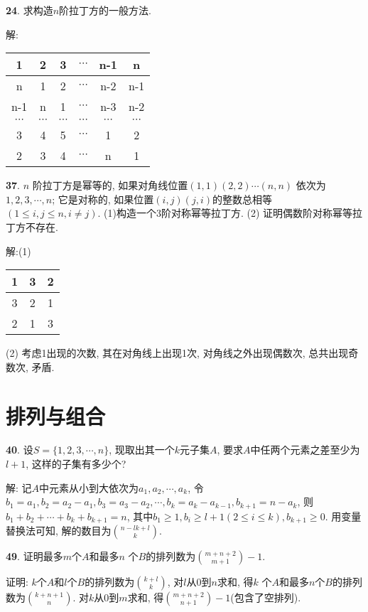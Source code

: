 \par \textbf{24}. 求构造$n$阶拉丁方的一般方法.
\par 解:
\par
\begin{tabular}{|c|c|c|c|c|c|}
\hline
1&2&3&$\cdots$&n-1&n\\
\hline
n&1&2&$\cdots$&n-2&n-1\\
\hline
n-1&n&1&$\cdots$&n-3&n-2\\
\hline
$\cdots$&$\cdots$&$\cdots$&$\cdots$&$\cdots$&$\cdots$\\
\hline
3&4&5&$\cdots$&1&2\\
\hline
2&3&4&$\cdots$&n&1\\
\hline
\end{tabular}

\par \textbf{37}. $n$ 阶拉丁方是幂等的, 如果对角线位置$(1,1)(2,2)\cdots(n,n)$ 依次为$1,2,3,\cdots,n$; 它是对称的, 如果位置$(i,j)(j,i)$的整数总相等$(1\le i,j\le n, i\neq j)$. (1)构造一个3阶对称幂等拉丁方. (2) 证明偶数阶对称幂等拉丁方不存在.

\par 解:(1)
\par 
\begin{tabular}{|c|c|c|}
\hline
1&3&2\\
\hline
3&2&1\\
\hline
2&1&3\\
\hline
\end{tabular}
\par
(2) 考虑1出现的次数, 其在对角线上出现1次, 对角线之外出现偶数次, 总共出现奇数次, 矛盾.

\section{排列与组合}

\par \textbf{40}. 设$S=\{1,2,3,\cdots,n\}$, 现取出其一个$k$元子集$A$, 要求$A$中任两个元素之差至少为$l+1$, 这样的子集有多少个?
\par 解: 记$A$中元素从小到大依次为$a_1,a_2,\cdots,a_k$, 令$b_1=a_1, b_2=a_2-a_1, b_3=a_3-a_2, \cdots, b_k=a_k-a_{k-1}, b_{k+1}=n-a_k$, 则$b_1+b_2+\cdots+b_k+b_{k+1}=n$, 其中$b_1\ge 1, b_i\ge l+1(2\le i\le k), b_{k+1}\ge 0$. 用变量替换法可知, 解的数目为$\binom{n-lk+l}{k}$.

\par \textbf{49}. 证明最多$m$个$A$和最多$n$ 个$B$的排列数为$\binom{m+n+2}{m+1}-1$.
\par 证明: $k$个$A$和$l$个$B$的排列数为$\binom{k+l}{k}$, 对$l$从0到$n$求和, 得$k$ 个$A$和最多$n$个$B$的排列数为$\binom{k+n+1}{n}$. 对$k$从0到$m$求和, 得$\binom{m+n+2}{n+1}-1$(包含了空排列).

